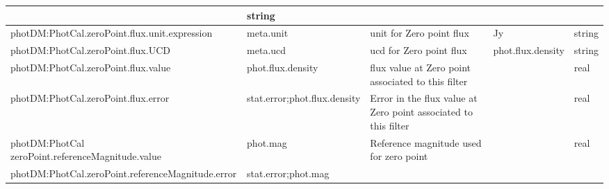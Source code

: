 \documentclass[11pt,a4paper]{ivoa}
\begin{document}
\begin{appendices}
\begin{table}[H]
\begin{adjustbox}{angle=90}
\begin{tabular}{p{3in}p{0.87in}p{2in}p{1in}p{0.25in}}
\multicolumn{1}{p{1in}}{} &
\multicolumn{1}{p{0.25in}}{{\fontsize{8pt}{8pt}\selectfont string}} \\
\hline
\multicolumn{1}{p{3in}}{{\fontsize{8pt}{8pt}
\selectfont photDM:PhotCal.zeroPoint.flux.unit.expression}} &
\multicolumn{1}{p{0.87in}}{{\fontsize{8pt}{8pt}\selectfont meta.unit }} &
\multicolumn{1}{p{2in}}{{\fontsize{8pt}{8pt}\selectfont unit for Zero point flux}} &
\multicolumn{1}{p{1in}}{{\fontsize{8pt}{8pt}\selectfont Jy}} &
\multicolumn{1}{p{0.25in}}{{\fontsize{8pt}{8pt}\selectfont string}} \\
\hline
\multicolumn{1}{p{3in}}{{\fontsize{8pt}{8pt}\selectfont photDM:PhotCal.zeroPoint.flux.UCD}} &
\multicolumn{1}{p{0.87in}}{{\fontsize{8pt}{8pt}\selectfont meta.ucd }} &
\multicolumn{1}{p{2in}}{{\fontsize{8pt}{8pt}\selectfont ucd for Zero point flux}} &
\multicolumn{1}{p{1in}}{{\fontsize{8pt}{8pt}\selectfont phot.flux.density}} &
\multicolumn{1}{p{0.25in}}{{\fontsize{8pt}{8pt}\selectfont string}} \\
\hline
\multicolumn{1}{p{3in}}{{\fontsize{8pt}{8pt}\selectfont photDM:PhotCal.zeroPoint.flux.value}} &
\multicolumn{1}{p{0.87in}}{{\fontsize{8pt}{8pt}\selectfont phot.flux.density }} &
\multicolumn{1}{p{2in}}{{\fontsize{8pt}{8pt}\selectfont flux value at Zero point associated 
to this filter}} &
\multicolumn{1}{p{1in}}{} &
\multicolumn{1}{p{0.25in}}{{\fontsize{8pt}{8pt}\selectfont real}} \\
\hline
\multicolumn{1}{p{3in}}{{\fontsize{8pt}{8pt}\selectfont photDM:PhotCal.zeroPoint.flux.error}} &
\multicolumn{1}{p{0.87in}}{{\fontsize{8pt}{8pt}\selectfont stat.error;phot.flux.density}} &
\multicolumn{1}{p{2in}}{{\fontsize{8pt}{8pt}\selectfont Error in the flux value at Zero point 
associated to this filter}} &
\multicolumn{1}{p{1in}}{} &
\multicolumn{1}{p{0.25in}}{{\fontsize{8pt}{8pt}\selectfont real}} \\
\hline
\multicolumn{1}{p{3in}}{{\fontsize{8pt}{8pt}
\selectfont photDM:PhotCal zeroPoint.referenceMagnitude.value}} &
\multicolumn{1}{p{0.87in}}{{\fontsize{8pt}{8pt}\selectfont phot.mag}} &
\multicolumn{1}{p{2in}}{{\fontsize{8pt}{8pt}\selectfont Reference magnitude used for zero point}} &
\multicolumn{1}{p{1in}}{{\fontsize{8pt}{8pt}\selectfont 0.0}} &
\multicolumn{1}{p{0.25in}}{{\fontsize{8pt}{8pt}\selectfont real} \par } \\
\hline
\multicolumn{1}{p{3in}}{{\fontsize{8pt}{8pt}
\selectfont photDM:PhotCal.zeroPoint.referenceMagnitude.error}} &
\multicolumn{1}{p{0.87in}}{{\fontsize{8pt}{8pt}\selectfont stat.error;phot.mag}} &


\end{tabular}
\end{adjustbox}
\end{table}
\end{appendices}
\end{document}
